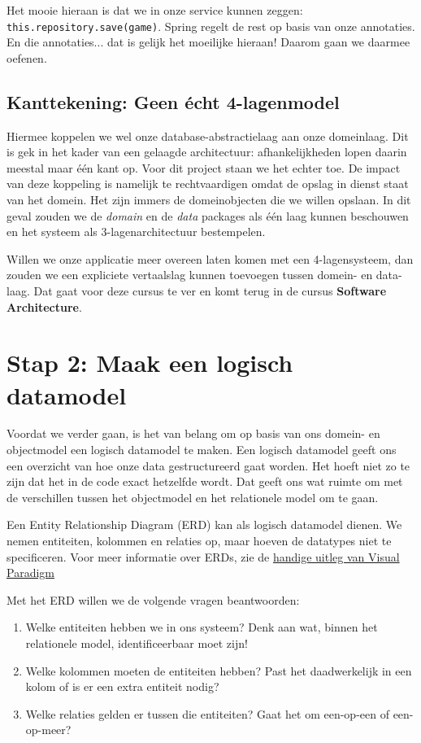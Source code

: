 Het mooie hieraan is dat we in onze service kunnen zeggen:
\texttt{this.repository.save(game)}. Spring regelt de rest op 
basis van onze annotaties. En die annotaties... dat is gelijk 
het moeilijke hieraan! Daarom gaan we daarmee oefenen.

\newpage
\subsection{Kanttekening: Geen écht 4-lagenmodel}
Hiermee koppelen we wel onze database-abstractielaag aan onze domeinlaag. Dit is 
gek in het kader van een gelaagde architectuur: afhankelijkheden lopen daarin 
meestal maar één kant op. Voor dit project staan we het echter toe.
De impact van deze koppeling is namelijk te rechtvaardigen omdat de opslag 
in dienst staat van het domein. Het zijn immers de domeinobjecten die we 
willen opslaan. In dit geval zouden we de \textit{domain} en de \textit{data}
packages als één laag kunnen beschouwen en het systeem als 3-lagenarchitectuur
bestempelen.

Willen we onze applicatie meer overeen laten komen met een 
4-lagensysteem, dan zouden we een expliciete 
vertaalslag kunnen toevoegen tussen domein- en data-laag. 
Dat gaat voor deze cursus te ver en komt terug in de cursus 
\textbf{Software Architecture}.

\section{Stap 2: Maak een logisch datamodel}
Voordat we verder gaan, is het van belang om op basis van 
ons domein- en objectmodel een logisch datamodel te maken. 
Een logisch datamodel geeft ons een overzicht van hoe onze 
data gestructureerd gaat worden. Het hoeft niet zo te zijn 
dat het in de code exact hetzelfde wordt. Dat geeft ons wat 
ruimte om met de verschillen tussen het objectmodel en het 
relationele model om te gaan.

Een Entity Relationship Diagram (ERD) kan als logisch datamodel dienen.
We nemen entiteiten, kolommen en relaties op, 
maar hoeven de datatypes niet te specificeren.
Voor meer informatie over ERDs, zie de 
\href{https://www.visual-paradigm.com/guide/data-modeling/what-is-entity-relationship-diagram/#erd-data-models-conceptual}{handige uitleg van Visual Paradigm}

Met het ERD willen we de volgende vragen beantwoorden:
\begin{enumerate}
    \item Welke entiteiten hebben we in ons systeem? 
    Denk aan wat, binnen het relationele model, identificeerbaar moet zijn!
    \item Welke kolommen moeten de entiteiten hebben?
    Past het daadwerkelijk in een kolom of is er een extra entiteit nodig?
    \item Welke relaties gelden er tussen die entiteiten?
    Gaat het om een-op-een of een-op-meer?
\end{enumerate}

